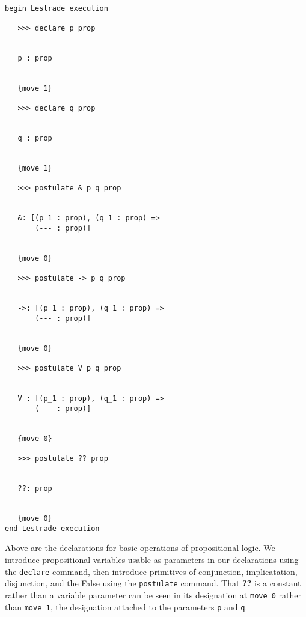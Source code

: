 \documentclass[12pt]{article}
\begin{document}
\begin{verbatim}

begin Lestrade execution

   >>> declare p prop


   p : prop


   {move 1}

   >>> declare q prop


   q : prop


   {move 1}

   >>> postulate & p q prop


   &: [(p_1 : prop), (q_1 : prop) => 
       (--- : prop)]


   {move 0}

   >>> postulate -> p q prop


   ->: [(p_1 : prop), (q_1 : prop) => 
       (--- : prop)]


   {move 0}

   >>> postulate V p q prop


   V : [(p_1 : prop), (q_1 : prop) => 
       (--- : prop)]


   {move 0}

   >>> postulate ?? prop


   ??: prop


   {move 0}
end Lestrade execution
\end{verbatim}

Above are the declarations for basic operations of propositional logic.  We introduce propositional variables usable as parameters in our declarations using the {\tt declare\/} command, then
introduce primitives of conjunction, implicatation, disjunction, and the False using the {\tt postulate\/} command.  That {\bf ??} is a constant rather than a variable parameter
can be seen in its designation at {\tt move 0\/} rather than {\tt move 1\/}, the designation attached to the parameters {\tt p} and {\tt q\/}.
\end{document}
